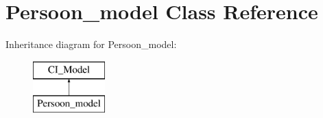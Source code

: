 \hypertarget{class_persoon__model}{}\section{Persoon\+\_\+model Class Reference}
\label{class_persoon__model}
Inheritance diagram for Persoon\+\_\+model\+:\begin{figure}[H]
\begin{center}
\leavevmode
\includegraphics[height=2.000000cm]{class_persoon__model}
\end{center}
\end{figure}
